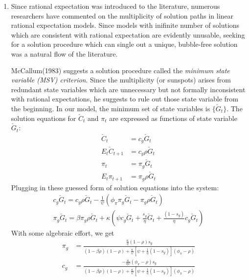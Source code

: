 \documentclass[11pt]{amsart}
\begin{document}
\begin{enumerate}[label = (\alph*)]
	\item Since rational expectation was introduced to the literature, numerous researchers have commented on the multiplicity of solution paths in linear rational expectation models. Since models with inifinite number of solutions which are consistent with rational expectation are evidently unusable, seeking for a solution procedure which can single out a unique, bubble-free solution was a natural flow of the literature. 
	
	McCallum(1983) suggests a solution procedure called the \textit{minimum state variable (MSV) criterion}. Since the multiplicity (or sunspots) arises from redundant state variables which are unnecessary but not formally inconsistent with rational expectations, he suggests to rule out those state variable from the beginning. In our model, the minimum set of state variables is $\{\check{ G }_t\}$. The solution equations for $\check{ C }_t$ and $\pi_t$ are expressed as functions of state variable $\check{ G }_t$:
	\begin{align*}
	\check{ C }_t &= c_g \check{ G}_t \\
	E_t \check{ C }_{t+1} &=c_g \rho \check{ G}_t \\
	\pi_t &= \pi_g \check{ G }_t \\
    E_t \pi_{t+1} & = \pi_g \rho \check{ G }_t	
	\end{align*}
	Plugging in these guessed form of solution equations into the system: 
	\begin{gather*}
	c_g \check{ G}_t = c_g \rho \check{ G}_t - \frac{1}{\psi} \left(\phi_\pi \pi_g \check{ G }_t - \pi_g \rho \check{ G }_t\right) \\
	\pi_g \check{ G }_t = \beta \pi_g \rho \check{ G }_t + \kappa \left( \psi c_g \check{ G}_t + \frac{s_g}{\eta} \check{ G}_t + \frac{(1-s_g)}{\eta} c_g \check{ G}_t \right)
	\end{gather*}
	With some algebraic effort, we get 
	\begin{align*}
	\pi _ { g } &= \frac { \frac { \kappa } { \eta } ( 1- \rho ) s _ { g } } { ( 1- \beta \rho ) ( 1- \rho ) + \frac { \kappa } { \psi } \left[ \psi + \frac { 1} { \eta } \left( 1- s _ { g } \right) \right] \left( \phi _ { \pi } - \rho \right) } \\
	c _ { g } &= \frac { - \frac { \kappa } { \eta \psi } \left( \phi _ { \pi } - \rho \right) s _ { g } } { \left( 1 -  \beta \rho \right) ( 1- \rho ) + \frac { \kappa } { \psi } \left[ \psi + \frac { 1} { \eta } \left( 1- s _ { g } \right) \right] \left( \phi _ { \pi } - \rho \right) }

\end{align*}
\end{enumerate}
\end{document}
